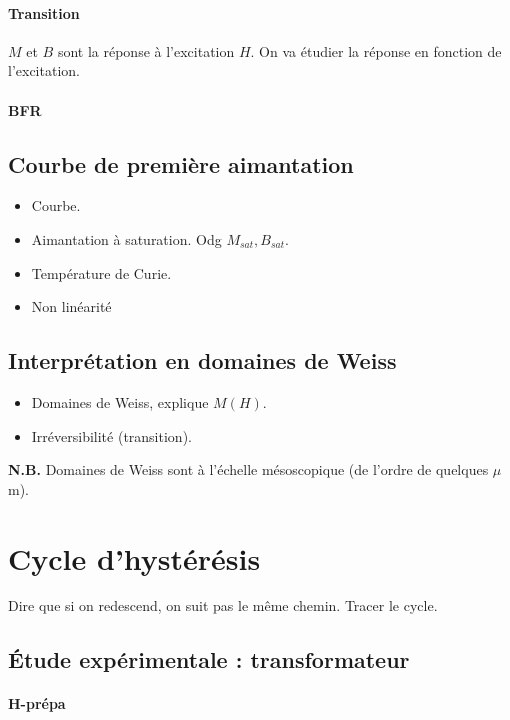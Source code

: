 \documentclass[11pt]{report}
\numberwithin{figure}{section}
\numberwithin{equation}{section}
\numberwithin{table}{section}
\newcommand{\1}{\boldsymbol{1}}
\begin{document}
\paragraph{Transition} $M$ et $B$ sont la réponse à l'excitation $H$. On va étudier la réponse en fonction de l'excitation.

\paragraph{BFR}

\subsection{Courbe de première aimantation}

\begin{itemize}
\item Courbe.
\item Aimantation à saturation. Odg $M_{sat}, B_{sat}$.
\item Température de Curie.
\item Non linéarité
\end{itemize}

\subsection{Interprétation en domaines de Weiss}

\begin{itemize}
\item Domaines de Weiss, explique $M(H)$.
\item Irréversibilité (transition).
\end{itemize}

\textbf{N.B.} Domaines de Weiss sont à l'échelle mésoscopique (de l'ordre de quelques $\mu$m).

\section{Cycle d'hystérésis}

Dire que si on redescend, on suit pas le même chemin. Tracer le cycle.

\subsection{Étude expérimentale : transformateur}

\paragraph{H-prépa}
\end{document}
